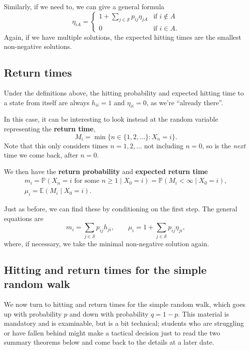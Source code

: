 \documentclass[
  a4paper,
]{article}
\theoremstyle{definition}
\theoremstyle{definition}
\theoremstyle{definition}
\theoremstyle{remark}
\begin{document}
Similarly, if we need to, we can give a general formula
\[ \eta_{iA} = \begin{cases} 1 + \displaystyle\sum_{j \in \mathcal S} p_{ij} \eta_{jA} & \text{if $i \not\in A$} \\
0 & \text{if $i \in A$.} \end{cases} \]
Again, if we have multiple solutions, the expected hitting times are the smallest non-negative solutions.

\hypertarget{return-times}{%
\subsection{Return times}\label{return-times}}

Under the definitions above, the hitting probability and expected hitting time to a state from itself are always \(h_{ii} = 1\) and \(\eta_{ii} = 0\), as we're ``already there''.

In this case, it can be interesting to look instead at the random variable representing the \textbf{return time},
\[ M_i = \min \big\{n \in \{1,2,\dots\} : X_n = i  \big\} . \]
Note that this only considers times \(n = 1, 2, \dots\) not including \(n = 0\), so is the \emph{next} time we come back, after \(n = 0\).

We then have the \textbf{return probability} and \textbf{expected return time}
\begin{gather*} m_{i} = \mathbb P(X_n = i  \text{ for some $n \geq 1$} \mid X_0 = i) = \mathbb P(M_i < \infty \mid X_0 = i) ,  \\
 \mu_{i} = \mathbb E(M_i \mid X_0 = i) .  \end{gather*}

Just as before, we can find these by conditioning on the first step. The general equations are
\[
      m_i = \sum_{j \in \mathcal S} p_{ij}h_{ji} , \qquad
      \mu_i = 1 + \sum_{j \in \mathcal S} p_{ij}\eta_{ji},
  \]
where, if necessary, we take the minimal non-negative solution again.

\hypertarget{return-rw}{%
\subsection{Hitting and return times for the simple random walk}\label{return-rw}}

We now turn to hitting and return times for the simple random walk, which goes up with probability \(p\) and down with probability \(q = 1-p\). This material is mandatory and is examinable, but is a bit technical; students who are struggling or have fallen behind might make a tactical decision just to read the two summary theorems below and come back to the details at a later date.
\end{document}

